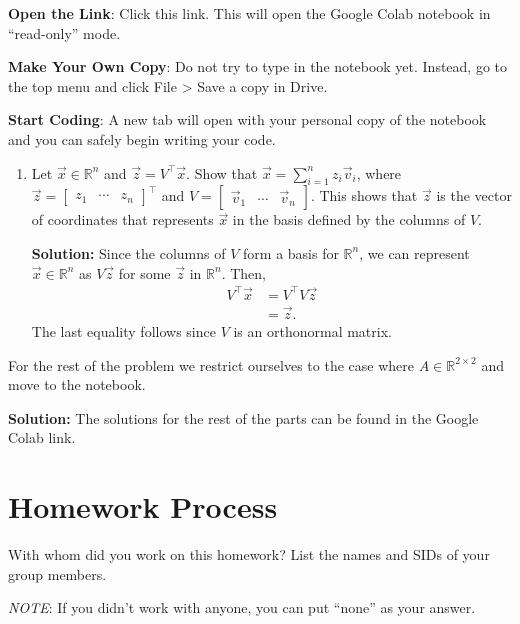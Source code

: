 \documentclass[10pt]{article}
\theoremstyle{definition}
\theoremstyle{plain}
\newcommand{\RR}{\mathbb{R}}
\begin{document}
\textbf{Open the Link}: Click this link. This will open the Google Colab notebook in ``read-only'' mode.

\textbf{Make Your Own Copy}: Do not try to type in the notebook yet. Instead, go to the top menu and click File > Save a copy in Drive.

\textbf{Start Coding}: A new tab will open with your personal copy of the notebook and you can safely begin writing your code.

\begin{enumerate}[label=(\alph*)]
\item Let $\vec{x} \in \RR^n$ and $\vec{z} = V^\top \vec{x}$. Show that $\vec{x} = \sum_{i=1}^n z_i \vec{v}_i$, where $\vec{z} = \begin{bmatrix} z_1 & \cdots & z_n \end{bmatrix}^\top$ and $V = \begin{bmatrix} \vec{v}_1 & \cdots & \vec{v}_n \end{bmatrix}$. This shows that $\vec{z}$ is the vector of coordinates that represents $\vec{x}$ in the basis defined by the columns of $V$.

\textbf{Solution:} Since the columns of $V$ form a basis for $\RR^n$, we can represent $\vec{x} \in \RR^n$ as $V\vec{z}$ for some $\vec{z}$ in $\RR^n$. Then,
\begin{align}
V^\top \vec{x} &= V^\top V \vec{z} \\
&= \vec{z}.
\end{align}
The last equality follows since $V$ is an orthonormal matrix.
\end{enumerate}

For the rest of the problem we restrict ourselves to the case where $A \in \RR^{2 \times 2}$ and move to the notebook.

\textbf{Solution:} The solutions for the rest of the parts can be found in the Google Colab link.

\section{Homework Process}

With whom did you work on this homework? List the names and SIDs of your group members.

\textit{NOTE}: If you didn't work with anyone, you can put ``none'' as your answer.
\end{document}
